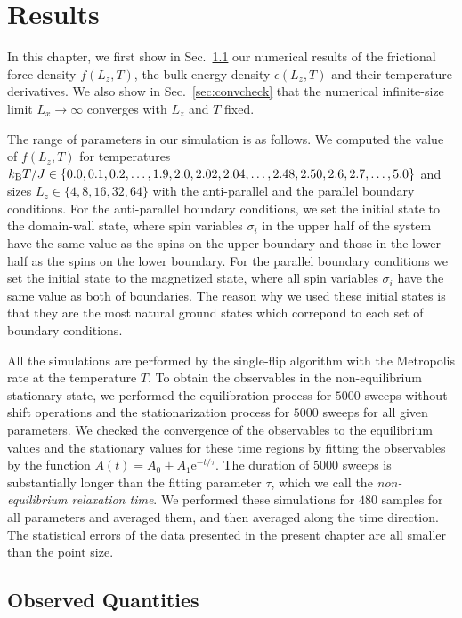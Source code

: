 \chapter{Results}\label{chap:Res}

In this chapter, we first show in Sec.~\ref{sec:NEMCs} our numerical results of the frictional force density $f(L_{z}, T)$, the bulk energy density $\epsilon(L_{z}, T)$ and their temperature derivatives. We also show in Sec.~\ref{sec:convcheck} that the numerical infinite-size limit $L_{x}\to\infty$ converges with $L_{z}$ and $T$ fixed.

The range of parameters in our simulation is as follows. We computed the value of $f(L_{z}, T)$ for temperatures $k_{\rm B}T/J\in\{0.0,0.1,0.2,\dots,1.9,2.0,2.02,2.04,\dots,2.48,2.50,2.6,2.7,\dots,5.0\}$ and sizes $L_{z}\in\{4,8,16,32,64\}$ with the anti-parallel and the parallel boundary conditions. For the anti-parallel boundary conditions, we set the initial state to the domain-wall state, where spin variables $\sigma_{i}$ in the upper half of the system have the same value as the spins on the upper boundary and those in the lower half as the spins on the lower boundary. For the parallel boundary conditions we set the initial state to the magnetized state, where all spin variables $\sigma_{i}$ have the same value as both of boundaries. The reason why we used these initial states is that they are the most natural ground states which correpond to each set of boundary conditions.

All the simulations are performed by the single-flip algorithm with the Metropolis rate at the temperature $T$. To obtain the observables in the non-equilibrium stationary state, we performed the equilibration process for $5000$ sweeps without shift operations and the stationarization process for $5000$ sweeps for all given parameters. We checked the convergence of the observables to the equilibrium values and the stationary values for these time regions by fitting the observables by the function $A(t)=A_{0} + A_{1}\mathrm{e}^{-t/\tau}$. The duration of $5000$ sweeps is substantially longer than the fitting parameter $\tau$, which we call the \textit{non-equilibrium relaxation time}. We performed these simulations for $480$ samples for all parameters and averaged them, and then averaged along the time direction. The statistical errors of the data presented in the present chapter are all smaller than the point size.

\section{Observed Quantities}\label{sec:NEMCs}

